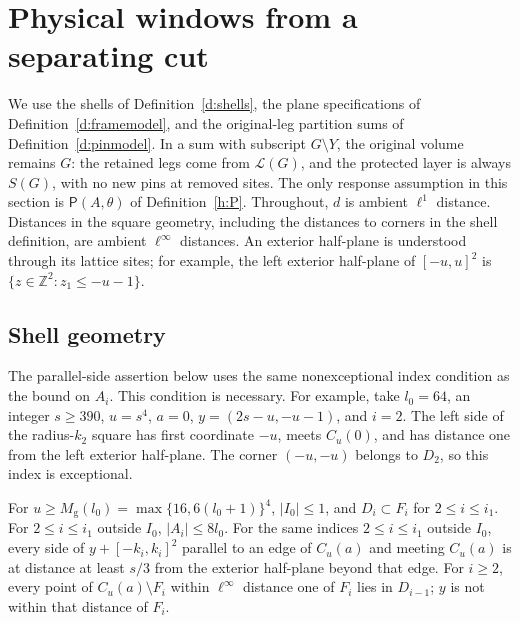 \section{Physical windows from a separating cut}\label{s:cut}

We use the shells of Definition~\ref{d:shells}, the plane
specifications of Definition~\ref{d:framemodel}, and the original-leg
partition sums of Definition~\ref{d:pinmodel}.  In a sum with subscript
\(G\setminus Y\), the original volume remains \(G\): the retained
legs come from \(\mathcal L(G)\), and the protected layer is always
\(S(G)\), with no new pins at removed sites.  The only response
assumption in this section is \(\mathsf P(A,\theta)\) of
Definition~\ref{h:P}.  Throughout, \(d\) is ambient \(\ell^1\)
distance.  Distances in the square geometry, including the distances
to corners in the shell definition, are ambient \(\ell^\infty\)
distances.  An exterior half-plane is understood through its lattice
sites; for example, the left exterior half-plane of \([-u,u]^2\) is
\(\{z\in\mathbb Z^2:z_1\le-u-1\}\).

\subsection{Shell geometry}

The parallel-side assertion below uses the same nonexceptional index
condition as the bound on \(A_i\).  This condition is necessary.  For
example, take \(l_0=64\), an integer \(s\ge390\), \(u=s^4\), \(a=0\),
\(y=(2s-u,-u-1)\), and \(i=2\).  The left side of the radius-\(k_2\)
square has first coordinate \(-u\), meets \(C_u(0)\), and has distance
one from the left exterior half-plane.  The corner \((-u,-u)\)
belongs to \(D_2\), so this index is exceptional.

\begin{lemma}\label{l:shellgeom}
For \(u\ge M_{\mathrm g}(l_0)=\max\{16,6(l_0+1)\}^4\),
\(|I_0|\le1\), and \(D_i\subset F_i\) for \(2\le i\le i_1\).
For \(2\le i\le i_1\) outside \(I_0\), \(|A_i|\le8l_0\).
For the same indices \(2\le i\le i_1\) outside \(I_0\), every side of
\(y+[-k_i,k_i]^2\) parallel to an edge of \(C_u(a)\)
and meeting \(C_u(a)\) is at distance at least \(s/3\) from the
exterior half-plane beyond that edge.
For \(i\ge2\), every point of \(C_u(a)\setminus F_i\)
within \(\ell^\infty\) distance one of \(F_i\) lies in \(D_{i-1}\);
\(y\) is not within that distance of \(F_i\).
\end{lemma}

